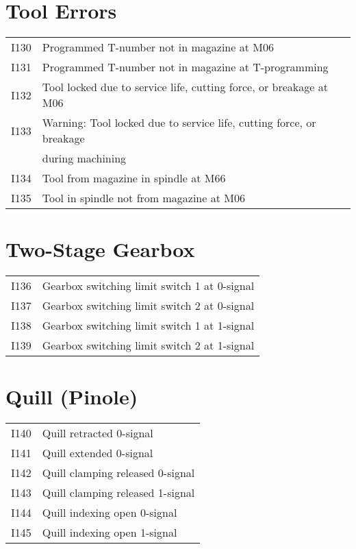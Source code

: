 \documentclass[openany,11pt]{book}
\begin{document}
\newpage

\section*{Tool Errors}

\begin{table}[!h]
    \begin{tabular}{ll}
    I130 & Programmed T-number not in magazine at M06 \\
    I131 & Programmed T-number not in magazine at T-programming \\
    I132 & Tool locked due to service life, cutting force, or breakage at M06 \\
    I133 & Warning: Tool locked due to service life, cutting force, or breakage \\
         & during machining \\
    I134 & Tool from magazine in spindle at M66 \\
    I135 & Tool in spindle not from magazine at M06 \\
    \end{tabular}
\end{table}

\section*{Two-Stage Gearbox}

\begin{table}[!h]
    \begin{tabular}{ll}
    I136 & Gearbox switching limit switch 1 at 0-signal \\
    I137 & Gearbox switching limit switch 2 at 0-signal \\
    I138 & Gearbox switching limit switch 1 at 1-signal \\
    I139 & Gearbox switching limit switch 2 at 1-signal \\
    \end{tabular}
\end{table}

\section*{Quill (Pinole)}

\begin{table}[!h]
    \begin{tabular}{ll}
    I140 & Quill retracted 0-signal \\
    I141 & Quill extended 0-signal \\
    I142 & Quill clamping released 0-signal \\
    I143 & Quill clamping released 1-signal \\
    I144 & Quill indexing open 0-signal \\
    I145 & Quill indexing open 1-signal \\
    \end{tabular}
\end{table}
\end{document}
